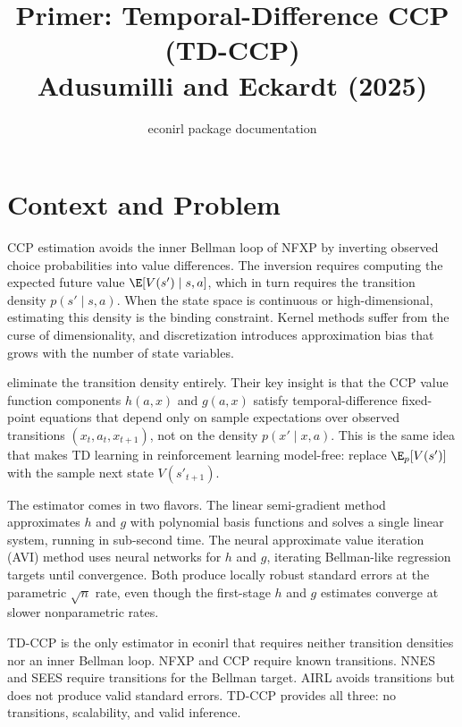 \documentclass[10pt]{article}
\title{Primer: Temporal-Difference CCP (TD-CCP)\\[4pt]
\large Adusumilli and Eckardt (2025)}
\author{econirl package documentation}
\date{}
\begin{document}
\maketitle

\section{Context and Problem}

CCP estimation \citep{hotzMiller1993} avoids the inner Bellman loop of NFXP by inverting observed choice probabilities into value differences.
The inversion requires computing the expected future value $\E[V(s') \mid s,a]$, which in turn requires the transition density $p(s' \mid s,a)$.
When the state space is continuous or high-dimensional, estimating this density is the binding constraint.
Kernel methods suffer from the curse of dimensionality, and discretization introduces approximation bias that grows with the number of state variables.

\citet{adusumilliEckardt2025} eliminate the transition density entirely.
Their key insight is that the CCP value function components $h(a,x)$ and $g(a,x)$ satisfy temporal-difference fixed-point equations that depend only on sample expectations over observed transitions $(x_t, a_t, x_{t+1})$, not on the density $p(x' \mid x,a)$.
This is the same idea that makes TD learning in reinforcement learning model-free: replace $\E_{p}[V(s')]$ with the sample next state $V(s'_{t+1})$.

The estimator comes in two flavors.
The linear semi-gradient method approximates $h$ and $g$ with polynomial basis functions and solves a single linear system, running in sub-second time.
The neural approximate value iteration (AVI) method uses neural networks for $h$ and $g$, iterating Bellman-like regression targets until convergence.
Both produce locally robust standard errors at the parametric $\sqrt{n}$ rate, even though the first-stage $h$ and $g$ estimates converge at slower nonparametric rates.

TD-CCP is the only estimator in econirl that requires neither transition densities nor an inner Bellman loop.
NFXP \citep{rust1987} and CCP require known transitions.
NNES \citep{nguyen2025} and SEES \citep{luoSang2024} require transitions for the Bellman target.
AIRL avoids transitions but does not produce valid standard errors.
TD-CCP provides all three: no transitions, scalability, and valid inference.
\end{document}
